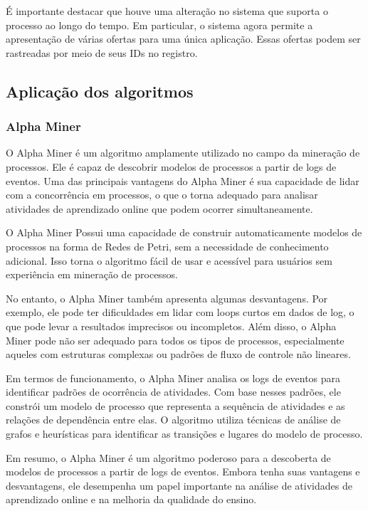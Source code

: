 \documentclass[tcc2]{classe_uftex/uftex}
\begin{document}
É importante destacar que houve uma alteração no sistema que suporta o processo ao longo do tempo. Em particular, o sistema agora permite a apresentação de várias ofertas para uma única aplicação. Essas ofertas podem ser rastreadas por meio de seus IDs no registro.

\subsection{Aplicação dos algoritmos}

\subsubsection{Alpha Miner}

O Alpha Miner é um algoritmo amplamente utilizado no campo da mineração de processos. Ele é capaz de descobrir modelos de processos a partir de logs de eventos. Uma das principais vantagens do Alpha Miner é sua capacidade de lidar com a concorrência em processos, o que o torna adequado para analisar atividades de aprendizado online que podem ocorrer simultaneamente.\cite{nafasa2019implementation}

O Alpha Miner Possui uma capacidade  de construir automaticamente modelos de processos na forma de Redes de Petri, sem a necessidade de conhecimento adicional. Isso torna o algoritmo fácil de usar e acessível para usuários sem experiência em mineração de processos.

No entanto, o Alpha Miner também apresenta algumas desvantagens. Por exemplo, ele pode ter dificuldades em lidar com loops curtos em dados de log, o que pode levar a resultados imprecisos ou incompletos. Além disso, o Alpha Miner pode não ser adequado para todos os tipos de processos, especialmente aqueles com estruturas complexas ou padrões de fluxo de controle não lineares.\cite{nafasa2019implementation}

Em termos de funcionamento, o Alpha Miner analisa os logs de eventos para identificar padrões de ocorrência de atividades. Com base nesses padrões, ele constrói um modelo de processo que representa a sequência de atividades e as relações de dependência entre elas. O algoritmo utiliza técnicas de análise de grafos e heurísticas para identificar as transições e lugares do modelo de processo.


Em resumo, o Alpha Miner é um algoritmo poderoso para a descoberta de modelos de processos a partir de logs de eventos. Embora tenha suas vantagens e desvantagens, ele desempenha um papel importante na análise de atividades de aprendizado online e na melhoria da qualidade do ensino.
\end{document}
